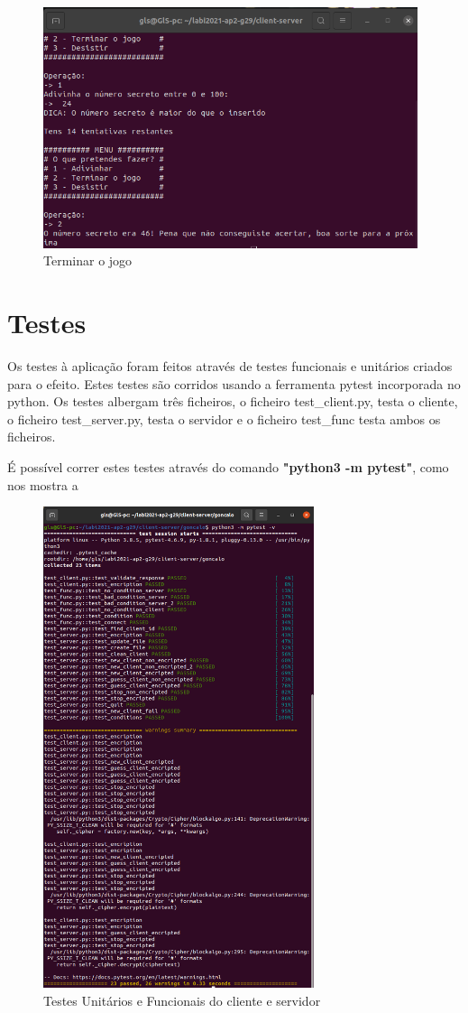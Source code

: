 \documentclass{report}
\begin{document}
\begin{figure}[!h]
\center 
\includegraphics[height=200pt]{img/fotos_resultado/stop_client.png}
\caption{Terminar o jogo}
\label{fig:stop_playing}
\end{figure}

\section{Testes}
\label{sec:testes}

Os testes à aplicação foram feitos através de testes funcionais e unitários criados para o efeito. Estes testes são corridos usando a ferramenta pytest incorporada no python. Os testes albergam três ficheiros, o ficheiro test\_client.py, testa o cliente, o ficheiro test\_server.py, testa o servidor e o ficheiro test\_func testa ambos os ficheiros.

É possível correr estes testes através do comando \textbf{"python3 -m pytest"}, como nos mostra a 

\begin{figure}[ht]
\center 
\includegraphics[height=400pt]{img/fotos_resultado/testes.png}
\caption{Testes Unitários e Funcionais do cliente e servidor}
\label{fig:stop_playing}
\end{figure}
\end{document}
